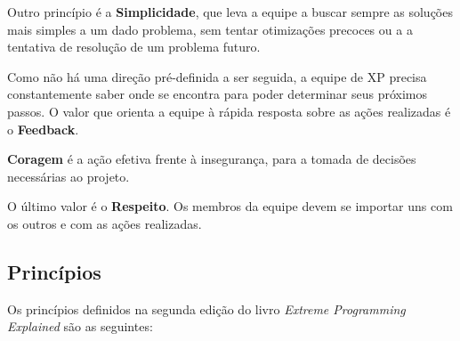\documentclass[a4paper,12pt,font=plain,header=plain]{abnt}
\begin{document}
      Outro princípio é a \textbf{Simplicidade}, que leva a equipe a buscar sempre as soluções mais simples a um dado problema, sem tentar otimizações precoces ou a a tentativa de resolução de um problema futuro.

      Como não há uma direção pré-definida a ser seguida, a equipe de XP precisa constantemente saber onde se encontra para poder determinar seus próximos passos. O valor que orienta a equipe à rápida resposta sobre as ações realizadas é o \textbf{Feedback}.

      \textbf{Coragem} é a ação efetiva frente à insegurança, para a tomada de decisões necessárias ao projeto.

      O último valor é o \textbf{Respeito}. Os membros da equipe devem se importar uns com os outros e com as ações realizadas.

    \subsection{Princípios}

      Os princípios definidos na segunda edição do livro \textit{Extreme Programming Explained}\cite{beck04} são as seguintes:
\end{document}
